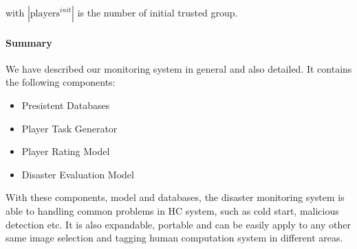   with $|\text{players}^{init}|$ is the number of initial trusted group. 

  \paragraph{Summary}

  We have described our monitoring system in general and also detailed. It contains the following components:

  \begin{itemize}
  \item Presistent Databases
  \item Player Task Generator
  \item Player Rating Model
  \item Disaster Evaluation Model
  \end{itemize}

  With these components, model and databases, the disaster monitoring system is able to handling
  common problems in HC system, such as cold start, malicious detection etc. It is also expandable,
  portable and can be easily apply to any other same image selection and tagging 
  human computation system in different areas.